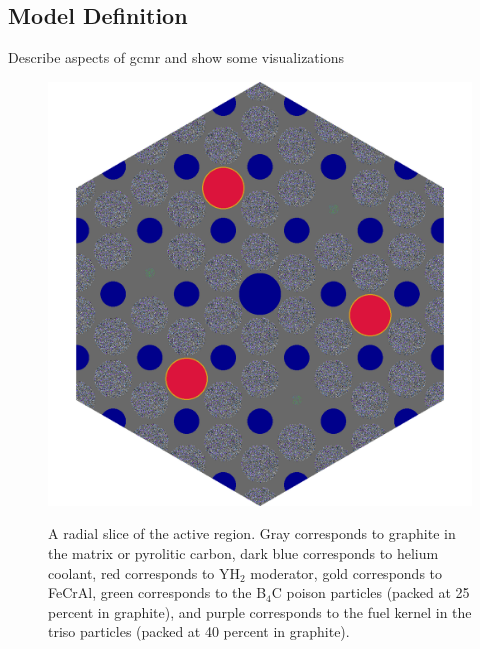 \documentclass[letterpaper]{physor2024}
\begin{document}
\subsection{Model Definition}\label{sec:model_def}
Describe aspects of gcmr and show some visualizations
\begin{figure}[h!]
    \centering
    \includegraphics[width=0.55\linewidth]{figures/active_height.png}
    \label{fig:active_slice}
    \caption{A radial slice of the active region. Gray corresponds to graphite in the matrix or pyrolitic carbon, dark blue corresponds to helium coolant, red corresponds to YH$_{2}$ moderator, gold corresponds to FeCrAl, green corresponds to the B$_{4}$C poison particles (packed at 25 percent in graphite), and purple corresponds to the fuel kernel in the \gls{triso} particles (packed at 40 percent in graphite).}
    \label{fig:core_slice_sbs}
\end{figure}
\end{document}
